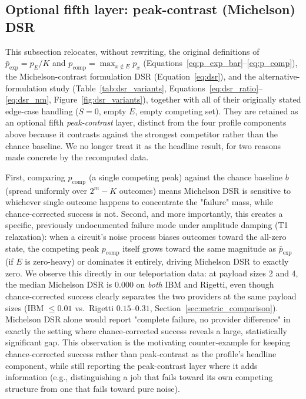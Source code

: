 \subsection{Optional fifth layer: peak-contrast (Michelson) DSR}
\label{sec:michelson-layer}

This subsection relocates, without rewriting, the original definitions of $\bar{p}_{\text{exp}} = p_E/K$ and $p_{\text{comp}} = \max_{x \notin E} p_x$ (Equations~\eqref{eq:p_exp_bar}--\eqref{eq:p_comp}), the Michelson-contrast formulation $\mathrm{DSR}$ (Equation~\eqref{eq:dsr}), and the alternative-formulation study (Table~\ref{tab:dsr_variants}, Equations~\eqref{eq:dsr_ratio}--\eqref{eq:dsr_nm}, Figure~\ref{fig:dsr_variants}), together with all of their originally stated edge-case handling ($S=0$, empty $E$, empty competing set). They are retained as an optional fifth \emph{peak-contrast} layer, distinct from the four profile components above because it contrasts against the strongest competitor rather than the chance baseline. We no longer treat it as the headline result, for two reasons made concrete by the recomputed data.

First, comparing $p_{\text{comp}}$ (a single competing peak) against the chance baseline $b$ (spread uniformly over $2^m - K$ outcomes) means Michelson DSR is sensitive to whichever single outcome happens to concentrate the "failure" mass, while chance-corrected success is not. Second, and more importantly, this creates a specific, previously undocumented failure mode under amplitude damping (T1 relaxation): when a circuit's noise process biases outcomes toward the all-zero state, the competing peak $p_{\text{comp}}$ itself grows toward the same magnitude as $\bar{p}_{\text{exp}}$ (if $E$ is zero-heavy) or dominates it entirely, driving Michelson DSR to exactly zero. We observe this directly in our teleportation data: at payload sizes 2 and 4, the median Michelson DSR is $0.000$ on \emph{both} IBM and Rigetti, even though chance-corrected success clearly separates the two providers at the same payload sizes (IBM $\leq 0.01$ vs.\ Rigetti $0.15$--$0.31$, Section~\ref{sec:metric_comparison}). Michelson DSR alone would report "complete failure, no provider difference" in exactly the setting where chance-corrected success reveals a large, statistically significant gap. This observation is the motivating counter-example for keeping chance-corrected success rather than peak-contrast as the profile's headline component, while still reporting the peak-contrast layer where it adds information (e.g., distinguishing a job that fails toward its own competing structure from one that fails toward pure noise).

